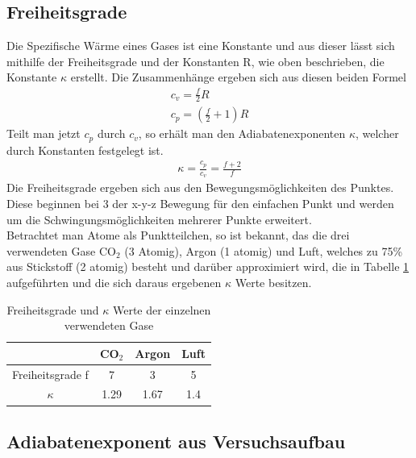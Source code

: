 \documentclass[12pt,a4paper,titlepage,headinclude,bibtotoc]{scrartcl}
\begin{document}
\subsection{Freiheitsgrade}
Die Spezifische Wärme eines Gases ist eine Konstante und aus dieser lässt sich mithilfe der Freiheitsgrade und der Konstanten R, wie oben beschrieben, die Konstante $\kappa$ erstellt.
Die Zusammenhänge ergeben sich aus diesen beiden Formel \cite[S. 262]{gerthsen}
\begin{align}
	c_v=\frac{f}{2}R\\
	c_p=\left(\frac{f}{2}+1\right)R
\end{align}
Teilt man jetzt $c_p$ durch $c_v$, so erhält man den Adiabatenexponenten $\kappa$, welcher durch Konstanten festgelegt ist.
\begin{align}
	\kappa=\frac{c_p}{c_v}=\frac{f+2}{f}
	\label{eq:kappa(f)}
\end{align}
Die Freiheitsgrade ergeben sich aus den Bewegungsmöglichkeiten des Punktes.
Diese beginnen bei 3 der x-y-z Bewegung für den einfachen Punkt und werden um die Schwingungsmöglichkeiten mehrerer Punkte erweitert.\\
Betrachtet man Atome als Punktteilchen, so ist bekannt, das die drei verwendeten Gase CO$_2$ (3 Atomig), Argon (1 atomig) und Luft, welches zu 75\% aus Stickstoff (2 atomig) besteht und darüber approximiert wird, die in Tabelle \ref{tab:kappafrei} aufgeführten und die sich daraus ergebenen $\kappa$ Werte besitzen.
\begin{table}[!h]
\centering
\begin{tabular}{|c|c|c|c|}
	\hline
				& CO$_2$	& Argon		& Luft\\
	\hline\hline
	Freiheitsgrade f	& 7		& 3		& 5\\
	$\kappa$		& 1.29		& 1.67		& 1.4\\
	\hline
\end{tabular}
\caption{Freiheitsgrade und $\kappa$ Werte der einzelnen verwendeten Gase}
\label{tab:kappafrei}
\end{table}

\subsection{Adiabatenexponent aus Versuchsaufbau}
\end{document}
